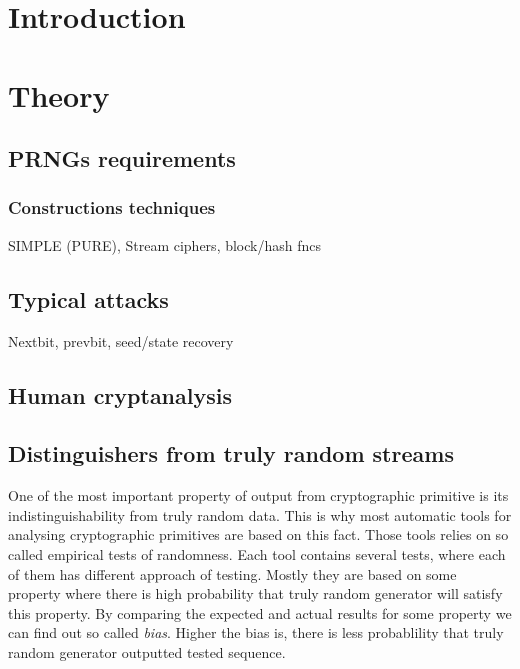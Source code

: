 \documentclass[
    digital,    %
    oneside,    %
    color,
    11pt,
    nocover,
    notable,
    nolof,
    nolot,
    final
]{fithesis3}
\begin{document}
\setlength{\parskip}{5pt}
\setlength{\parindent}{0pt}

\newtheorem{theorem}{Theorem}[section] %
\newtheorem{formula}[theorem]{Formula}     %

\chapter{Introduction}
\label{chap:introduction}


\chapter{Theory}

\section{PRNGs requirements}

\subsection{Constructions techniques}

SIMPLE (PURE), Stream ciphers, block/hash fncs

\section{Typical attacks}
Nextbit, prevbit, seed/state recovery

\section{Human cryptanalysis}
\cite{human-cryptanalysis}

\section{Distinguishers from truly random streams}

One of the most important property of output from cryptographic primitive is its indistinguishability from truly random data. This is why most automatic tools for analysing cryptographic primitives are based on this fact. Those tools relies on so called empirical tests of randomness. Each tool contains several tests, where each of them has different approach of testing. Mostly they are based on some property where there is high probability that truly random generator will satisfy this property. By comparing the expected and actual results for some property we can find out so called \textit{bias}. Higher the bias is, there is less probablility that truly random generator outputted tested sequence.
\end{document}
